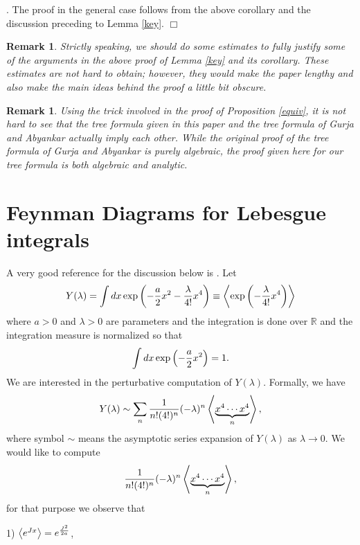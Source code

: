 \documentclass{article}
\newcommand{\bb}{\mathbb}
\newtheorem{Rem}[defn]{Remark}
\newtheorem{main theorem}[defn]{Main Theorem}
\begin{document}
. The proof in the
general case follows from the above corollary and the discussion
preceding to Lemma \ref{key}. \hfill $\Box$
\begin{Rem}
Strictly speaking, we should do some estimates to fully justify
some of the arguments in the above proof of Lemma \ref{key} and
its corollary. These estimates are not hard to obtain; however,
they would make the paper lengthy and also make the main ideas
behind the proof a little bit obscure.
\end{Rem}

\begin{Rem}
Using the trick involved in the proof of Proposition \ref{equiv},
it is not hard to see that the tree formula given in this paper
and the tree formula of Gurja and Abyankar actually imply each
other. While the original proof of the tree formula of Gurja and
Abyankar is purely algebraic, the proof given here for our tree
formula is both algebraic and analytic.
\end{Rem}

\appendix

\section{Feynman Diagrams for Lebesgue integrals}
A very good reference for the discussion below is \cite{BIZ80}.
Let
\begin{equation}
Y(\lambda)=\int dx\exp\left(-{a\over 2}x^2-{\lambda\over
4!}x^4\right)\equiv \left\langle \exp\left(-{\lambda\over
4!}x^4\right)\right\rangle
\end{equation}
where $a>0$ and $\lambda>0$ are parameters and the integration is
done  over $\bb R$ and the integration measure is normalized so
that
\begin{equation}
\int dx\exp\left(-{a\over 2}x^2\right)=1.
\end{equation}
We are interested in the perturbative computation of $Y(\lambda)$.
Formally, we have
\begin{equation}
Y(\lambda)\sim \sum_n {1\over n!(4!)^n}(-\lambda)^n\left\langle
\underbrace{x^4\cdots x^4}_n\right\rangle,
\end{equation}
where symbol $\sim$ means the asymptotic series expansion of
$Y(\lambda)$ as $\lambda\to 0$. We would like to compute
$${1\over n!(4!)^n}(-\lambda)^n\left\langle  \underbrace{x^4\cdots x^4}_n\right\rangle,$$ for that purpose we
observe that

1) $\left\langle e^{Jx}\right\rangle=e^{J^2\over 2a}$,
\end{document}
